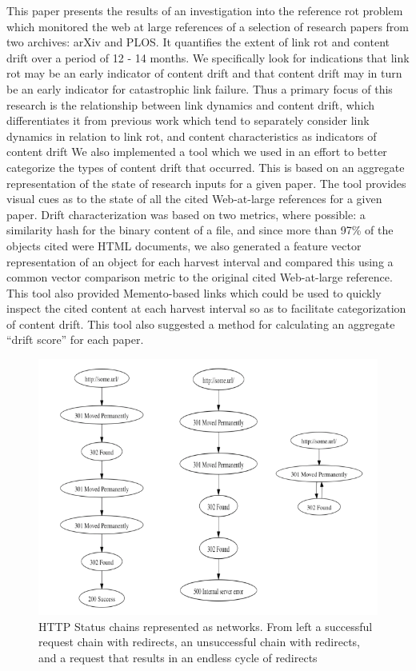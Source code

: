 \documentclass[12pt]{article}
\begin{document}
This paper presents the results of an investigation into the reference rot problem which monitored the web at large references of a selection of research papers from two archives: arXiv and PLOS. It quantifies the extent of link rot and content drift over a period of 12  - 14 months. We specifically look for indications that  link rot may be an early indicator of content drift and that content drift may in turn be an early indicator for catastrophic link failure.  Thus a primary focus of this research is the relationship between link dynamics and content drift, which differentiates it from previous work which tend to separately consider link dynamics in relation to link rot, and content characteristics as indicators of content drift We also implemented a tool which we used in an effort to better categorize the types of content drift that occurred. This is based on an aggregate representation of the state of research inputs for a given paper.  The tool provides visual cues as to the state of all the cited Web-at-large references for a given paper. Drift characterization was based on two metrics, where possible: a similarity hash for the binary content of a file, and since more than 97\% of the objects cited were HTML documents, we also generated a feature vector representation of an object for each harvest interval and compared this using a common vector comparison metric to the original cited Web-at-large reference. This tool also provided Memento-based links which could be used to quickly inspect the cited content at each harvest interval so as to facilitate categorization of content drift. This tool also suggested a method for calculating an aggregate “drift score” for each paper. 

\begin{figure}[ht!]
  \includegraphics[width=\linewidth,natwidth=610,natheight=642]{figure1.png}
  \caption{HTTP Status chains represented as networks. From left a successful request chain with redirects, an unsuccessful chain with redirects, and a request that results in an endless cycle of redirects}
  \label{fig:statuschains}
\end{figure}
\end{document}
